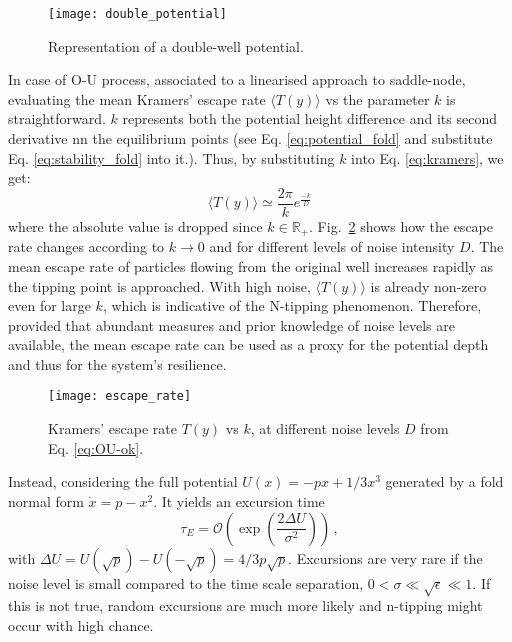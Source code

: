 \begin{figure}[h!]
	\centering
	\texttt{[image: double\_potential]}
	\caption{\small Representation of a double-well potential.}
	\label{fig:double_well}
\end{figure}


In case of \gls{O-U} process, associated to a linearised approach to saddle-node, evaluating the mean Kramers' escape rate $\langle T(y) \rangle$ vs the parameter $k$ is straightforward. $k$ represents both the potential height difference and its second derivative nn the equilibrium points (see Eq. \ref{eq:potential_fold} and substitute Eq. \ref{eq:stability_fold} into it.). Thus, by substituting $k$ into Eq. \ref{eq:kramers}, we get:
\begin{equation} \label{eq:exit_time}
	\langle T(y) \rangle \simeq \frac{2 \pi}{ k} e^{\frac{-k}{D}}
\end{equation}
where the absolute value is dropped since $k \in \mathbb{R}_+$. Fig.~\ref{fig:kramers} shows how the escape rate changes according to $k \to 0$ and for different levels of noise intensity $D$. The mean escape rate of particles flowing from the original well increases rapidly as the tipping point is approached. With high noise, $\langle T(y) \rangle$ is already non-zero even for large $k$, which is indicative of the N-tipping phenomenon. Therefore, provided that abundant measures and prior knowledge of noise levels are available, the mean escape rate can be used as a proxy for the potential depth and thus for the system's resilience.

\begin{figure}[h!]
	\centering
	\texttt{[image: escape\_rate]}
	\caption{\small Kramers' escape rate $T(y)$ vs $k$, at different noise levels $D$ from Eq. \ref{eq:OU-ok}.}
	\label{fig:kramers}
\end{figure}

Instead, considering the full potential $U(x) = - px + 1/3 x^3$ generated by a fold normal form $\dot{x} = p - x^2$. It yields an excursion time \citep{Freidlin,Berglund2006} 
\begin{equation}
	\tau_E = \mathcal{O}\left( \exp \left(\frac{2\Delta U}{\sigma^2} \right) \right) \, ,
\end{equation}
 with $\Delta U = U(\sqrt{p}) - U(-\sqrt{p}) = 4/3 p \sqrt{p}$. Excursions are very rare if the noise level is small compared to the time scale separation, $0 < \sigma \ll \sqrt{\epsilon} \ll 1$. If this is not true, random excursions are much more likely and  n-tipping might occur with high chance. \\


